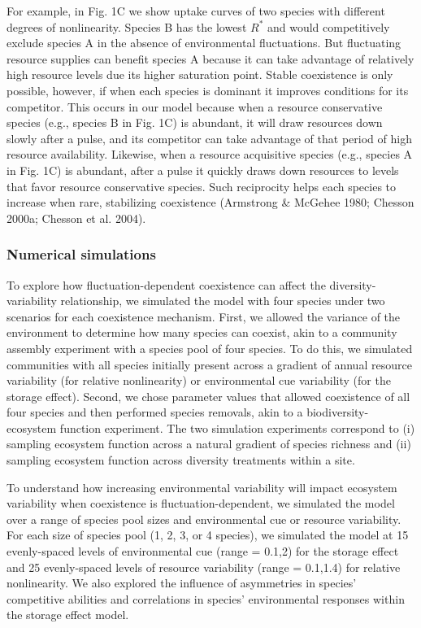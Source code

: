\documentclass[12pt,]{article}
\begin{document}
For example, in Fig. 1C we show uptake curves of two species with
different degrees of nonlinearity. Species B has the lowest \(R^*\) and
would competitively exclude species A in the absence of environmental
fluctuations. But fluctuating resource supplies can benefit species A
because it can take advantage of relatively high resource levels due its
higher saturation point. Stable coexistence is only possible, however,
if when each species is dominant it improves conditions for its
competitor. This occurs in our model because when a resource
conservative species (e.g., species B in Fig. 1C) is abundant, it will
draw resources down slowly after a pulse, and its competitor can take
advantage of that period of high resource availability. Likewise, when a
resource acquisitive species (e.g., species A in Fig. 1C) is abundant,
after a pulse it quickly draws down resources to levels that favor
resource conservative species. Such reciprocity helps each species to
increase when rare, stabilizing coexistence (Armstrong \& McGehee 1980;
Chesson 2000a; Chesson et al. 2004).

\subsubsection{Numerical simulations}\label{numerical-simulations}

To explore how fluctuation-dependent coexistence can affect the
diversity-variability relationship, we simulated the model with four
species under two scenarios for each coexistence mechanism. First, we
allowed the variance of the environment to determine how many species
can coexist, akin to a community assembly experiment with a species pool
of four species. To do this, we simulated communities with all species
initially present across a gradient of annual resource variability (for
relative nonlinearity) or environmental cue variability (for the storage
effect). Second, we chose parameter values that allowed coexistence of
all four species and then performed species removals, akin to a
biodiversity-ecosystem function experiment. The two simulation
experiments correspond to (i) sampling ecosystem function across a
natural gradient of species richness and (ii) sampling ecosystem
function across diversity treatments within a site.

To understand how increasing environmental variability will impact
ecosystem variability when coexistence is fluctuation-dependent, we
simulated the model over a range of species pool sizes and environmental
cue or resource variability. For each size of species pool (1, 2, 3, or
4 species), we simulated the model at 15 evenly-spaced levels of
environmental cue (range = 0.1,2) for the storage effect and 25
evenly-spaced levels of resource variability (range = 0.1,1.4) for
relative nonlinearity. We also explored the influence of asymmetries in
species' competitive abilities and correlations in species'
environmental responses within the storage effect model.
\end{document}

